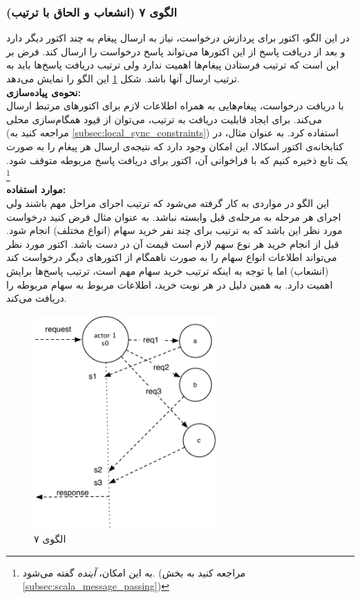 \subsubsection{الگوی ۷ (انشعاب و الحاق با ترتیب)}
در این الگو، اکتور برای پردازش درخواست، نیاز به ارسال پیغام به چند اکتور دیگر دارد و بعد از دریافت پاسخ از این اکتورها می‌تواند پاسخ درخواست را ارسال کند. فرض بر این است که ترتیب فرستادن پیغام‌ها‌‌ اهمیت ندارد ولی ترتیب دریافت پاسخ‌‌ها باید به ترتیب ارسال آنها باشد. شکل \ref{fig:Patterns_statefull_7} این الگو را نمایش می‌دهد.\\
\textbf{نحوه‌ی پیاده‌سازی:}\\

با دریافت درخواست، پیغام‌هایی به همراه اطلاعات لازم برای اکتورهای مرتبط ارسال می‌کند. برای ایجاد قابلیت دریافت به ترتیب، می‌توان از قیود‌ همگام‌سازی محلی (مراجعه کنید به \ref{subsec:local_sync_constraints}) استفاده کرد. به عنوان مثال، در کتابخانه‌ی اکتور اسکالا، این امکان وجود دارد که نتیجه‌ی ارسال هر پیغام را به صورت یک تابع ذخیره کنیم که با فراخوانی آن، اکتور برای دریافت پاسخ مربوطه متوقف شود. \footnote{به این امکان، \textit{آینده} 
 گفته می‌شود. (مراجعه کنید به بخش \ref{subsec:scala_message_passing}) }\\
 
\textbf{موارد استفاده:}\\
این الگو در مواردی به کار گرفته می‌شود که ترتیب اجرای مراحل مهم باشند ولی اجرای هر مرحله به مرحله‌ی قبل وابسته نباشد. به عنوان مثال فرض کنید درخواست مورد نظر این باشد که به ترتیب برای چند نفر خرید سهام (انواع مختلف) انجام شود. قبل از انجام خرید هر نوع سهم  لازم است قیمت آن در دست باشد. اکتور مورد نظر می‌تواند اطلاعات انواع سهام را به صورت ناهمگام از اکتورهای دیگر درخواست کند (انشعاب) اما با توجه به اینکه ترتیب خرید سهام مهم است، ترتیب پاسخ‌ها برایش اهمیت دارد. به همین دلیل در هر نوبت خرید، اطلاعات مربوط به سهام مربوطه را دریافت می‌کند.
\begin{figure}[ht]
    \begin{center}
	\includegraphics[width=7cm]{4-ProposedFramework/Figures/Patterns_statelfull_fj_sequenced_receive.pdf}
    \end{center}
    \caption{\label{fig:Patterns_statefull_7}الگوی ۷}
\end{figure}
\FloatBarrier


